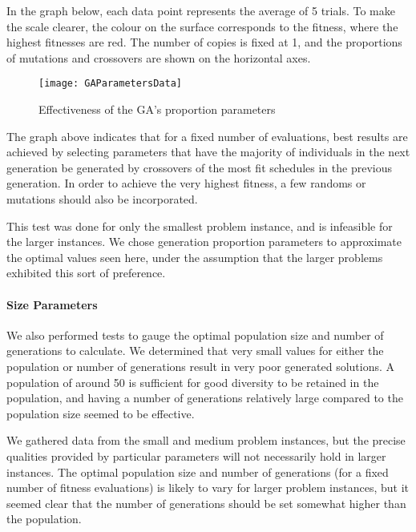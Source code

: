 \documentclass[letterpaper]{article}
\begin{document}
        In the graph below, each data point represents the average of 5 trials. To make 
        the scale clearer, the colour on the surface corresponds to the fitness, where 
        the highest fitnesses are red. The number of copies is fixed at 1, and the proportions 
        of mutations and crossovers are shown on the horizontal axes.
        
        \begin{figure}[H]
  		  \centering
  		  \texttt{[image: GAParametersData]}
  	      \caption{Effectiveness of the GA's proportion parameters}
  	      \label{graph:GAParam1}
		\end{figure}	
        
        The graph above indicates that for a fixed number of evaluations, best results are 
        achieved by selecting parameters that have the majority of individuals in the next 
        generation be generated by crossovers of the most fit schedules in the previous 
        generation. In order to achieve the very highest fitness, a few randoms or mutations 
        should also be incorporated.
        
        This test was done for only the smallest problem instance, and is infeasible for the 
        larger instances. We chose generation proportion parameters to approximate the optimal 
        values seen here, under the assumption that the larger problems exhibited this sort of 
        preference.
        
      \paragraph{Size Parameters}
        We also performed tests to gauge the optimal population size and number of generations 
        to calculate. We determined that very small values for either the population or number 
        of generations result in very poor generated solutions. A population of around 50 is 
        sufficient for good diversity to be retained in the population, and having a number of 
        generations relatively large compared to the population size seemed to be effective.
       
        We gathered data from the small and medium problem instances, but the precise qualities 
        provided by particular parameters will not necessarily hold in larger instances. The 
        optimal population size and number of generations (for a fixed number of fitness 
        evaluations) is likely to vary for larger problem instances, but it seemed clear that 
        the number of generations should be set somewhat higher than the population.
        
\end{document}
